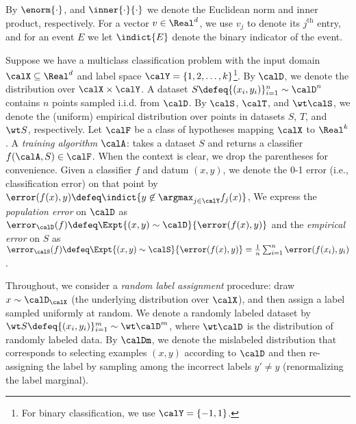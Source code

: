 By $\enorm{\cdot}$, 
and $\inner{\cdot}{\cdot}$
we denote the Euclidean norm
and inner product,
respectively.
For a vector $v\in \Real^d$, 
we use $v_j$ to denote its $j^\text{th}$ entry, and for an event $E$ we let $\indict{E}$ denote the binary indicator of the event.

Suppose we have a multiclass classification problem
with the input domain $\calX \subseteq \Real^d$ 
and label space $\calY = \{1, 2, \ldots, k\}$\footnote{For 
binary classification, 
we use $\calY = \{-1,1\}$.}. 
By $\calD$, we denote the distribution 
over $\calX \times \calY$. 
A dataset $S \defeq \{(x_i, y_i)\}_{i=1}^n \sim \calD^n$
contains $n$ points sampled i.i.d. from $\calD$.
By $\calS$, $\calT$, and $\wt \calS$, 
we denote the (uniform) empirical distribution
over points in datasets $S$, $T$, 
and $\wt S$, respectively. 
Let $\calF$ be a class of hypotheses 
mapping $\calX$ to $\Real^{k}$.  
A \emph{training algorithm} $\calA$:
takes a dataset $S$
and returns a classifier $f(\calA,S) \in \calF$. 
When the context is clear,
we drop the parentheses for convenience.
Given a classifier $f$ and datum $(x, y)$,
we denote the 0-1 error 
(i.e., classification error)
on that point by 
$\error(f(x), y) \defeq \indict{ y\not\in \argmax_{j\in\calY} f_j(x) }$,
We express the \emph{population error} on $\calD$ as
$\error_\calD (f) \defeq \Expt{(x,y) \sim \calD}{\error(f(x),y) }$ 
and the \emph{empirical error} on $S$ as  
$\error_\calS(f) \defeq \Expt{(x,y) \sim \calS}{\error(f(x),y)} = \frac{1}{n} \sum_{i=1}^n {\error(f(x_i),y_i)}$.


Throughout,
we consider 
a \emph{random label assignment} procedure: 
draw $x\sim \calD_\calX$ 
(the underlying distribution over $\calX$),
and then assign a label sampled
uniformly at random. 
We denote a randomly labeled dataset 
by $\wt S \defeq \{ (x_i, y_i)\}_{i=1}^m \sim \wt \calD^m $, 
where $\wt \calD$
is the distribution of randomly labeled data. 
By $\calDm$, we denote the mislabeled distribution
that corresponds to selecting examples $(x,y)$ 
according to $\calD$ and then re-assigning the label 
by sampling among the incorrect labels $y' \neq y$
(renormalizing the label marginal). 



